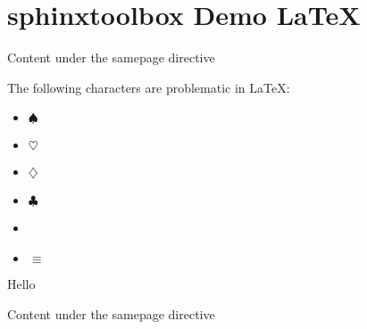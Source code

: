 \documentclass[letterpaper,10pt,english]{sphinxmanual}
\begin{document}
\chapter{sphinx\sphinxhyphen{}toolbox Demo \sphinxhyphen{} LaTeX}
\label{\detokenize{latex:sphinx-toolbox-demo-latex}}\label{\detokenize{latex::doc}}
\clearpage

\par\begin{samepage}

Content under the samepage directive

\begin{figure}[htbp]
\centering

\noindent{}
\end{figure}

\end{samepage}\par

\cleardoublepage

The \hspace{0pt}following \hspace{0pt}characters \hspace{0pt}are \hspace{0pt}problematic \hspace{0pt}in \hspace{0pt}LaTeX:
\begin{itemize}
\item {}
 $\spadesuit$

\item {}
 $\heartsuit$

\item {}
 $\diamondsuit$

\item {}
 $\clubsuit$

\item {}
\textmu

\item {}
 $\equiv$

\end{itemize}

\clearpage

Hello

\clearpage

\par\begin{samepage}

Content under the samepage directive

\begin{figure}[htbp]
\centering

\noindent{}
\end{figure}

\end{samepage}\par
\end{document}
